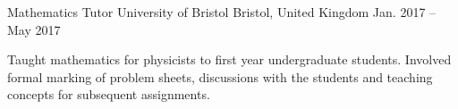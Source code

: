 
\begin{cventries}

\iffalse
    \cventry
      {Computing Demonstrator} %
      {University of Bristol} %
      {Bristol, United Kingdom} %
      {Nov. 2019 -- Present} %
      {
        \begin{cvitems} %
          \item{Will involve helping third year undergraduate students learn Python and apply it to numerically solve physics problems. I will also mark their assignments and provide feedback.}
        \end{cvitems}
      }
\fi

    \cventry
      {Mathematics Tutor} %
      {University of Bristol} %
      {Bristol, United Kingdom} %
      {Jan. 2017 -- May 2017} %
      {
        \begin{cvitems} %
          \item{Taught mathematics for physicists to first year undergraduate students. Involved formal marking of problem sheets, discussions with the students and teaching concepts for subsequent assignments.}
        \end{cvitems}
      }

\end{cventries}
